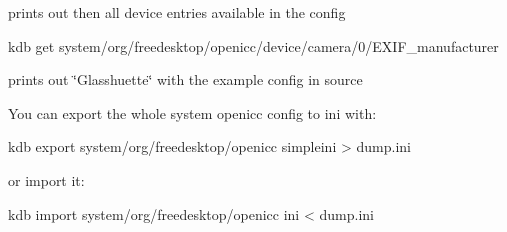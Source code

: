 prints out then all device entries available in the config


\begin{DoxyCode}
kdb get system/org/freedesktop/openicc/device/camera/0/EXIF\_manufacturer
\end{DoxyCode}


prints out \char`\"{}\+Glasshuette\char`\"{} with the example config in source

You can export the whole system openicc config to ini with\+:


\begin{DoxyCode}
kdb export system/org/freedesktop/openicc simpleini > dump.ini
\end{DoxyCode}


or import it\+:


\begin{DoxyCode}
kdb import system/org/freedesktop/openicc ini < dump.ini
\end{DoxyCode}
 